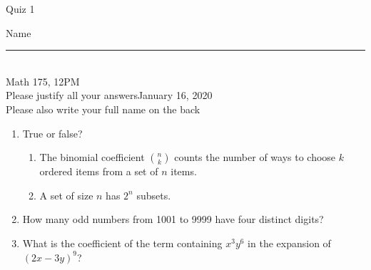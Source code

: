 \documentclass[12pt]{article}
\begin{document}
\begin{flushleft} 
\centerline{\LARGE{Quiz 1}} 
\vspace{5 mm}
{Name \rule {2 in}{0.01in}}\\
Math 175, 12PM
\\
{Please justify all your answers}\hfill {January 16, 2020}
\\
{Please also write your full name on the back} 

\medskip
\end{flushleft}

\begin{enumerate}
	\item True or false?
	\begin{enumerate}
		\item The binomial coefficient $\binom{n}{k}$ counts the number of ways to choose $k$ ordered items from a set of $n$ items.\\
		\item A set of size $n$ has $2^n$ subsets.
	\end{enumerate}

	\item How many odd numbers from 1001 to 9999 have four distinct digits?
	\vfill
	\item What is the coefficient of the term containing $x^3y^6$ in the expansion of $(2x-3y)^9$?
	\vfill	
\end{enumerate}
\end{document}
